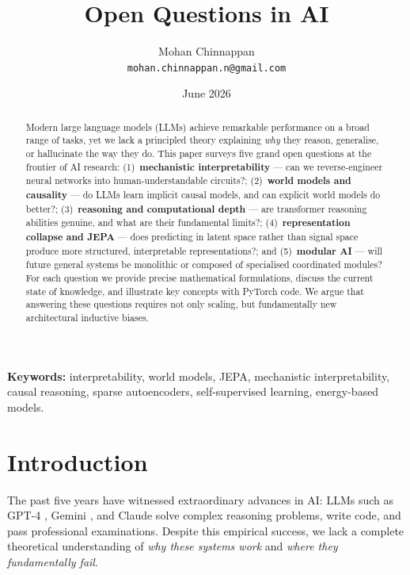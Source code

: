 \documentclass[10pt,twocolumn]{article}
\title{Open Questions in AI}
\author{
  Mohan Chinnappan \\
  \texttt{mohan.chinnappan.n@gmail.com}
}
\date{June 2026}
\begin{document}

\maketitle

\begin{abstract}
Modern large language models (LLMs) achieve remarkable performance on a
broad range of tasks, yet we lack a principled theory explaining
\emph{why} they reason, generalise, or hallucinate the way they do.
This paper surveys five grand open questions at the frontier of AI
research: (1)~\textbf{mechanistic interpretability} — can we reverse-engineer
neural networks into human-understandable circuits?; (2)~\textbf{world models
and causality} — do LLMs learn implicit causal models, and can explicit
world models do better?; (3)~\textbf{reasoning and computational depth} — are
transformer reasoning abilities genuine, and what are their fundamental
limits?; (4)~\textbf{representation collapse and JEPA} — does predicting in
latent space rather than signal space produce more structured, interpretable
representations?; and (5)~\textbf{modular AI} — will future general systems
be monolithic or composed of specialised coordinated modules?  For each
question we provide precise mathematical formulations, discuss the current
state of knowledge, and illustrate key concepts with PyTorch code.  We
argue that answering these questions requires not only scaling, but
fundamentally new architectural inductive biases.
\end{abstract}

\textbf{Keywords:} interpretability, world models, JEPA, mechanistic
interpretability, causal reasoning, sparse autoencoders, self-supervised
learning, energy-based models.

\section{Introduction}

The past five years have witnessed extraordinary advances in AI: LLMs
such as GPT-4 \citep{openai2023gpt4}, Gemini \citep{gemini2023}, and
Claude \citep{anthropic2024claude} solve complex reasoning problems,
write code, and pass professional examinations.  Despite this empirical
success, we lack a complete theoretical understanding of \emph{why these
systems work} and \emph{where they fundamentally fail}.
\end{document}
